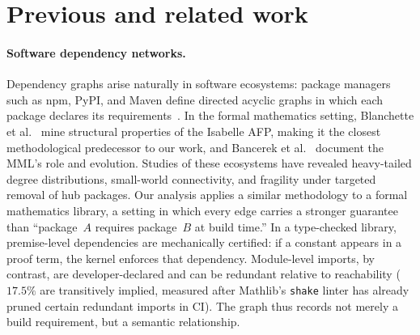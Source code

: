 \section{Previous and related work}
\paragraph{Software dependency networks.}
Dependency graphs arise naturally in software ecosystems: package managers such as npm, PyPI, and Maven define directed acyclic graphs in which each package declares its requirements~\cite{decan2019,labelle2004}. In the formal mathematics setting, Blanchette et al.~\cite{blanchette2015} mine structural properties of the Isabelle AFP, making it the closest methodological predecessor to our work, and Bancerek et al.~\cite{bancerek2018} document the MML's role and evolution. Studies of these ecosystems have revealed heavy-tailed degree distributions, small-world connectivity, and fragility under targeted removal of hub packages. Our analysis applies a similar methodology to a formal mathematics library, a setting in which every edge carries a stronger guarantee than ``package~$A$ requires package~$B$ at build time.'' In a type-checked library, premise-level dependencies are mechanically certified: if a constant appears in a proof term, the kernel enforces that dependency. Module-level imports, by contrast, are developer-declared and can be redundant relative to reachability ($17.5\%$ are transitively implied, measured after Mathlib's \texttt{shake} linter has already pruned certain redundant imports in CI). The graph thus records not merely a build requirement, but a semantic relationship.

